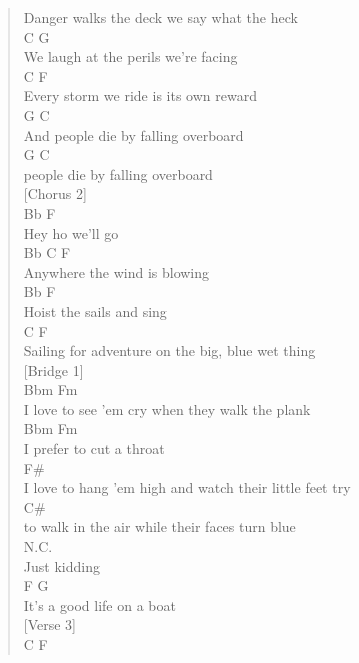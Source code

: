 \documentclass[11pt]{article}
\begin{document}
\begin{verse}
Danger walks the deck we say what the heck\\
\hspace*{3em}C                         G\\
We laugh at the perils we're facing\\
\hspace*{6em}C                    F\\
Every storm we ride is its own reward\\
\hspace*{4em}G                     C\\
And people die by falling overboard\\
G                     C\\
people die by falling overboard\\
\vspace*{1em}
[Chorus 2]\\
Bb     F\\
Hey ho we'll go\\
Bb C         F\\
Anywhere the wind is blowing\\
Bb        F\\
Hoist the sails and sing\\
C                            F\\
Sailing for adventure on the big, blue wet thing\\
\vspace*{1em}
[Bridge 1]\\
Bbm                             Fm\\
I love to see 'em cry when they walk the plank\\
\hspace*{4em}Bbm           Fm\\
I prefer to cut a throat\\
F\#\\
I love to hang 'em high and watch their little feet try\\
\hspace*{31em}C\#\\
to walk in the air while their faces turn blue\\
N.C.\\
Just kidding\\
F                            G\\
It's a good life on a boat\\
\vspace*{1em}
[Verse 3]\\
\hspace*{10em}C                  F\\

\end{verse}
\end{document}

